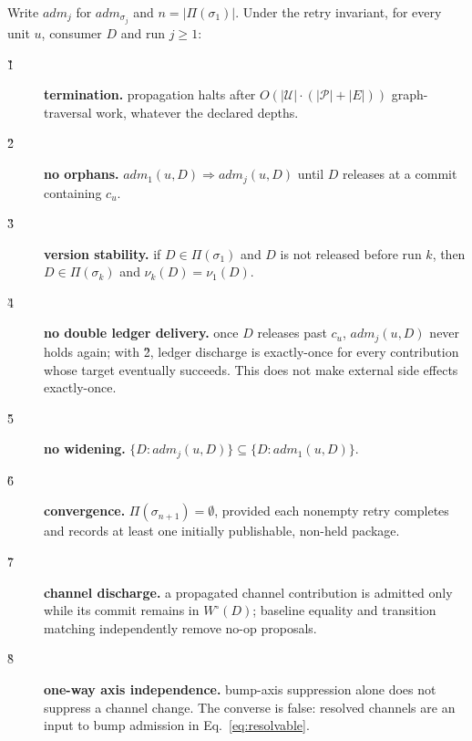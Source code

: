 \begin{theorem}
\label{thm:g}
Write $\mathit{adm}_j$ for $\mathit{adm}_{\sigma_j}$ and $n =
|\Pi(\sigma_1)|$. Under the retry invariant, for every unit $u$, consumer
$D$ and run $j \geq 1$:
\begin{description}
  \item[\G{1}] \textbf{termination.} propagation halts after $O(|\mathcal{U}|
    \cdot (|\mathcal{P}|{+}|E|))$ graph-traversal work, whatever the declared depths.
  \item[\G{2}] \textbf{no orphans.} $\mathit{adm}_1(u,D) \Rightarrow
    \mathit{adm}_j(u,D)$ until $D$ releases at a commit containing
    $c_u$.
  \item[\G{3}] \textbf{version stability.} if $D \in \Pi(\sigma_1)$ and $D$ is not
    released before run $k$, then $D \in \Pi(\sigma_k)$ and $\nu_k(D) =
    \nu_1(D)$.
  \item[\G{4}] \textbf{no double ledger delivery.} once $D$ releases past $c_u$,
    $\mathit{adm}_j(u,D)$ never holds again; with \G{2}, ledger discharge is
    exactly-once for every contribution whose target eventually succeeds.
    This does not make external side effects exactly-once.
  \item[\G{5}] \textbf{no widening.} $\{D : \mathit{adm}_j(u,D)\} \subseteq
    \{D : \mathit{adm}_1(u,D)\}$.
  \item[\G{6}] \textbf{convergence.} $\Pi(\sigma_{n+1}) = \emptyset$, provided
    each nonempty retry completes and records at least one initially
    publishable, non-held package.
  \item[\G{7}] \textbf{channel discharge.} a propagated channel contribution is
    admitted only while its commit remains in $W^\circ(D)$; baseline
    equality and transition matching independently remove no-op proposals.
  \item[\G{8}] \textbf{one-way axis independence.} bump-axis suppression alone
    does not suppress a channel change. The converse is false: resolved channels
    are an input to bump admission in Eq.~\ref{eq:resolvable}.
\end{description}
\end{theorem}

